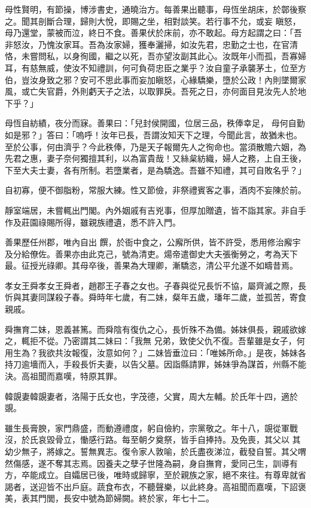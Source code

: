 \begin{pinyinscope}
 母性賢明，有節操，博涉書史，通曉治方。每善果出聽事，母恆坐胡床，於鄣後察之。聞其剖斷合理，歸則大悅，即賜之坐，相對談笑。若行事不允，或妄
 瞋怒，母乃還堂，蒙被而泣，終日不食。善果伏於床前，亦不敢起。母方起謂之曰：「吾非怒汝，乃愧汝家耳。吾為汝家婦，獲奉灑掃，如汝先君，忠勤之士也，在官清恪，未嘗問私，以身徇國，繼之以死，吾亦望汝副其此心。汝既年小而孤，吾寡婦耳，有慈無威，使汝不知禮訓，何可負荷忠臣之業乎？汝自童子承襲茅土，位至方伯，豈汝身致之邪？安可不思此事而妄加瞋怒，心緣驕樂，墮於公政！內則墜爾家風，或亡失官爵，外則虧天子之法，以取罪戾。吾死之日，亦何面目見汝先人於地下乎？」



 母恆自紡績，夜分而寐。善果曰：「兒封侯開國，位居三品，秩俸幸足，
 母何自勤如是邪？」答曰：「嗚呼！汝年已長，吾謂汝知天下之理，今聞此言，故猶未也。至於公事，何由濟乎？今此秩俸，乃是天子報爾先人之徇命也。當須散贍六姻，為先君之惠，妻子奈何獨擅其利，以為富貴哉！又絲枲紡織，婦人之務，上自王後，下至大夫士妻，各有所制。若墮業者，是為驕逸。吾雖不知禮，其可自敗名乎？」



 自初寡，便不御脂粉，常服大練。性又節儉，非祭禮賓客之事，酒肉不妄陳於前。



 靜室端居，未嘗輒出門閣。內外姻戚有吉兇事，但厚加贈遺，皆不詣其家。非自手作及莊園祿賜所得，雖親族禮遺，悉不許入門。



 善果歷任州郡，唯內自出
 饌，於衙中食之，公廨所供，皆不許受，悉用修治廨宇及分給僚佐。善果亦由此克己，號為清吏。煬帝遣御史大夫張衡勞之，考為天下最。征授光祿卿。其母卒後，善果為大理卿，漸驕恣，清公平允遂不如疇昔焉。



 孝女王舜孝女王舜者，趙郡王子春之女也。子春與從兄長忻不協，屬齊滅之際，長忻與其妻同謀殺子春。舜時年七歲，有二妹，粲年五歲，璠年二歲，並孤苦，寄食親戚。



 舜撫育二妹，恩義甚篤。而舜陰有復仇之心，長忻殊不為備。姊妹俱長，親戚欲嫁之，輒拒不從。乃密謂其二妹曰：「我無
 兄弟，致使父仇不復。吾輩雖是女子，何用生為？我欲共汝報復，汝意如何？」二妹皆垂泣曰：「唯姊所命。」是夜，姊妹各持刀逾墻而入，手殺長忻夫妻，以告父墓。因詣縣請罪，姊妹爭為謀首，州縣不能決。高祖聞而嘉嘆，特原其罪。



 韓覬妻韓覬妻者，洛陽于氏女也，字茂德，父實，周大左輔。於氏年十四，適於覬。



 雖生長膏腴，家門鼎盛，而動遵禮度，躬自儉約，宗黨敬之。年十八，覬從軍戰沒，於氏哀毀骨立，慟感行路。每至朝夕奠祭，皆手自捧持。及免喪，其父以
 其幼少無子，將嫁之。誓無異志。復令家人敦喻，於氏盡夜涕泣，截發自誓。其父喟然傷感，遂不奪其志焉。因養夫之孽子世隆為嗣，身自撫育，愛同己生，訓導有方，卒能成立。自孀居已後，唯時或歸寧，至於親族之家，絕不來往。有尊卑就省謁者，送迎皆不出戶庭。蔬食布衣，不聽聲樂，以此終身。高祖聞而嘉嘆，下詔褒美，表其門閭，長安中號為節婦闕。終於家，年七十二。




\end{pinyinscope}
